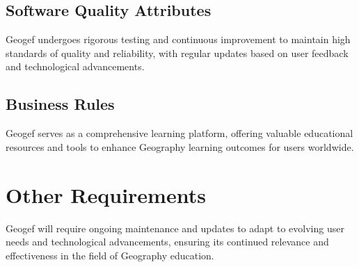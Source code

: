 \documentclass{scrreprt}
\begin{document}
\section{Software Quality Attributes}
Geogef undergoes rigorous testing and continuous improvement to maintain high standards of quality and reliability, with regular updates based on user feedback and technological advancements.

\section{Business Rules}
Geogef serves as a comprehensive learning platform, offering valuable educational resources and tools to enhance Geography learning outcomes for users worldwide.

\chapter{Other Requirements}

Geogef will require ongoing maintenance and updates to adapt to evolving user needs and technological advancements, ensuring its continued relevance and effectiveness in the field of Geography education.
\end{document}
